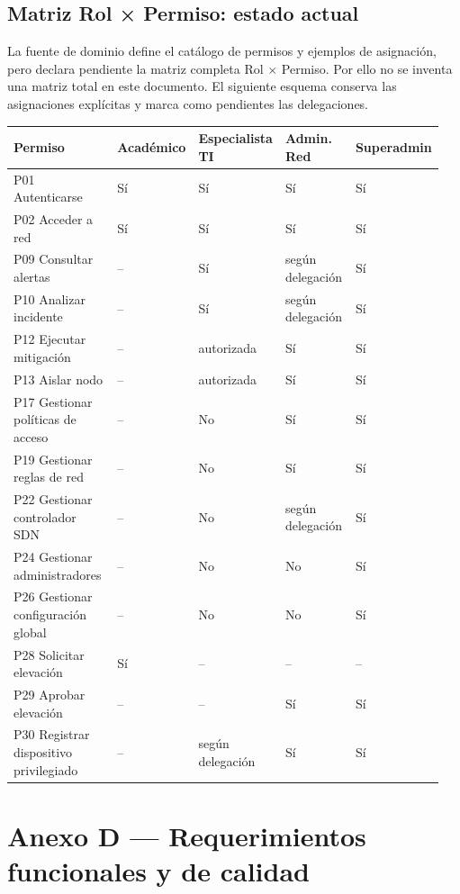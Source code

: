 \documentclass[11pt,a4paper]{article}
\begin{document}
\subsection{Matriz Rol × Permiso: estado actual}

La fuente de dominio define el catálogo de permisos y ejemplos de asignación, pero declara pendiente la matriz completa Rol × Permiso. Por ello no se inventa una matriz total en este documento. El siguiente esquema conserva las asignaciones explícitas y marca como pendientes las delegaciones.

\begin{longtable}{p{0.27\linewidth}p{0.17\linewidth}p{0.17\linewidth}p{0.17\linewidth}p{0.17\linewidth}}
\toprule
Permiso & Académico & Especialista TI & Admin. Red & Superadmin\\
\midrule
P01 Autenticarse & Sí & Sí & Sí & Sí\\
P02 Acceder a red & Sí & Sí & Sí & Sí\\
P09 Consultar alertas & -- & Sí & según delegación & Sí\\
P10 Analizar incidente & -- & Sí & según delegación & Sí\\
P12 Ejecutar mitigación & -- & autorizada & Sí & Sí\\
P13 Aislar nodo & -- & autorizada & Sí & Sí\\
P17 Gestionar políticas de acceso & -- & No & Sí & Sí\\
P19 Gestionar reglas de red & -- & No & Sí & Sí\\
P22 Gestionar controlador SDN & -- & No & según delegación & Sí\\
P24 Gestionar administradores & -- & No & No & Sí\\
P26 Gestionar configuración global & -- & No & No & Sí\\
P28 Solicitar elevación & Sí & -- & -- & --\\
P29 Aprobar elevación & -- & -- & Sí & Sí\\
P30 Registrar dispositivo privilegiado & -- & según delegación & Sí & Sí\\
\bottomrule
\end{longtable}

\section{Anexo D --- Requerimientos funcionales y de calidad}
\end{document}
